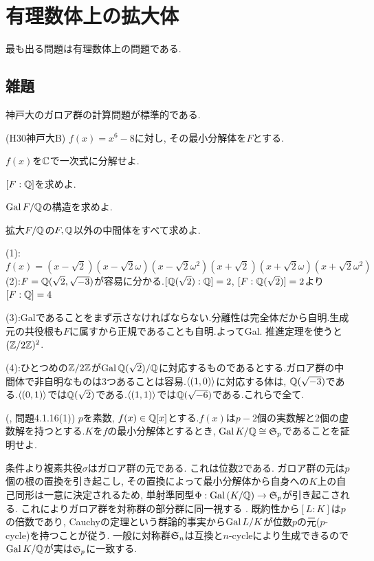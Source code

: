 \section{有理数体上の拡大体}
最も出る問題は有理数体上の問題である.
\subsection{雑題}

神戸大のガロア群の計算問題が標準的である.
\begin{egprob} (H30神戸大B) \label{egprob:H30_kobe_B}
$f(x) = x^6-8$に対し, その最小分解体を$F$とする.
\ben
\item $f(x)$を$\mathbb{C}$で一次式に分解せよ.
\item $[F:\mathbb{Q}]$を求めよ.
\item $\operatorname{Gal}{F/\mathbb{Q}}$の構造を求めよ.
\item 拡大$F/\mathbb{Q}$の$F,\mathbb{Q}$以外の中間体をすべて求めよ.
\een
\end{egprob}
\begin{egans}
(1):
\[f(x) = (x-\sqrt{2})(x-\sqrt{2}\omega)(x-\sqrt{2}\omega^2)(x+\sqrt{2})(x+\sqrt{2}\omega)(x+\sqrt{2}\omega^2)\]
(2):$F=\mathbb{Q}(\sqrt{2},\sqrt{-3})$が容易に分かる.$[\mathbb{Q}(\sqrt{2}):\mathbb{Q}]=2$, $[F:\mathbb{Q}(\sqrt{2})]=2$より$[F:\mathbb{Q}] = 4$

(3):Galであることをまず示さなければならない.分離性は完全体だから自明.生成元の共役根も$F$に属すから正規であることも自明.よってGal. 推進定理を使うと$(\mathbb{Z}/2\mathbb{Z})^{2}$.

(4):ひとつめの$\mathbb{Z}/2\mathbb{Z}$が$\operatorname{Gal}{\mathbb{Q}(\sqrt{2})/\mathbb{Q}}$に対応するものであるとする.ガロア群の中間体で非自明なものは3つあることは容易.$\langle (1,0)\rangle$に対応する体は, $\mathbb{Q}(\sqrt{-3})$である.$\langle (0,1)\rangle$では$\mathbb{Q}(\sqrt{2})$である.$\langle (1,1) \rangle$では$\mathbb{Q}(\sqrt{-6})$である.これらで全て.
\end{egans}


\begin{egprob} (, \cite{aoyukie}問題4.1.16(1))
$p$を素数, $f(x)\in \mathbb{Q}[x]$とする.$f(x)$は$p-2$個の実数解と$2$個の虚数解を持つとする.$K$を$f$の最小分解体とするとき, $\operatorname{Gal}{K/\mathbb{Q}} \cong \mathfrak{S}_{p}$であることを証明せよ.
\end{egprob}
\begin{egans}
条件より複素共役$\sigma$はガロア群の元である. これは位数2である. ガロア群の元は$p$個の根の置換を引き起こし, その置換によって最小分解体から自身への$K$上の自己同形は一意に決定されるため, 単射準同型$\Phi: \operatorname{Gal}{(K/\mathbb{Q})} \to \mathfrak{S}_{p}$が引き起こされる. これによりガロア群を対称群の部分群に同一視する
. 既約性から$[L:K]$は$p$の倍数であり, Cauchyの定理という群論的事実から$\operatorname{Gal}{L/K}$が位数$p$の元($p$-cycle)を持つことが従う. 一般に対称群$\mathfrak{S}_n$は互換と$n$-cycleにより生成できるので$\operatorname{Gal}{K/\mathbb{Q}}$が実は$\mathfrak{S}_{p}$に一致する.
\end{egans}

